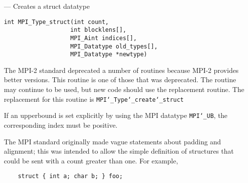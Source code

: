 \startmanpage
{}
--- Creates a struct datatype 
\startvb\begin{verbatim}
int MPI_Type_struct(int count,
                   int blocklens[],
                   MPI_Aint indices[],
                   MPI_Datatype old_types[],
                   MPI_Datatype *newtype)

\end{verbatim}
\endvb

\par
{}
\par
{}
The MPI-2 standard deprecated a number of routines because MPI-2 provides
better versions.  This routine is one of those that was deprecated.  The
routine may continue to be used, but new code should use the replacement
routine.
The replacement for this routine is {\tt MPI{\tt \char`\_}Type{\tt \char`\_}create{\tt \char`\_}struct
}
\par
{}
If an upperbound is set explicitly by using the MPI datatype {\tt MPI{\tt \char`\_}UB}, the
corresponding index must be positive.
\par
The MPI standard originally made vague statements about padding and alignment;
this was intended to allow the simple definition of structures that could
be sent with a count greater than one.  For example,
\begin{verbatim}
    struct { int a; char b; } foo;
\end{verbatim}

